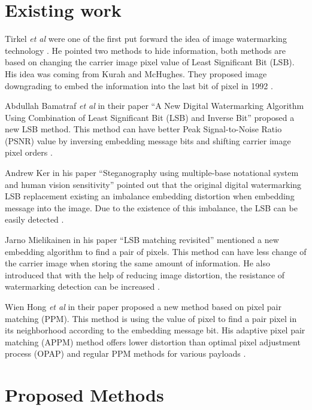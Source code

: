 \documentclass[%
    reprint,
    amsmath,amssymb,
    aps,
   ]{revtex4-1}
\begin{document}
   
   
   \section{\label{sec:level1}Existing work}
   
   Tirkel \textit{et al} were one of the first put forward the idea of image watermarking technology \cite{tirkel1993electronic}. He pointed two methods to hide information, both methods are based on changing the carrier image pixel value of Least Significant Bit (LSB). His idea was coming from Kurah and McHughes. They proposed image downgrading to embed the information into the last bit of pixel in 1992 \cite{kurak1992cautionary}. 
   
   Abdullah Bamatraf \textit{et al} in their paper “A New Digital Watermarking Algorithm Using Combination of Least Significant Bit (LSB) and Inverse Bit” proposed a new LSB method. This method can have better Peak Signal-to-Noise Ratio (PSNR) value by inversing embedding message bits and shifting carrier image pixel orders \cite{bamatraf2011new}.
   
   Andrew Ker in his paper “Steganography using multiple-base notational system and human vision sensitivity” pointed out that the original digital watermarking LSB replacement existing an imbalance embedding distortion when embedding message into the image. Due to the existence of this imbalance, the LSB can be easily detected \cite{ker2004improved}. 
   
   Jarno Mielikainen in his paper “LSB matching revisited” mentioned a new embedding algorithm to find a pair of pixels. This method can have less change of the carrier image when storing the same amount of information. He also introduced that with the help of reducing image distortion, the resistance of watermarking detection can be increased \cite{mielikainen2006lsb}. 
   
   Wien Hong \textit{et al} in their paper proposed a new method based on pixel pair matching (PPM). This method is using the value of pixel to find a pair pixel in its neighborhood according to the embedding message bit. His adaptive pixel pair matching (APPM) method offers lower distortion than optimal pixel adjustment process (OPAP) and regular PPM methods for various payloads \cite{hong2012novel}. 
   
   
   
   \section{\label{sec:level1}Proposed Methods}
   
\end{document}
